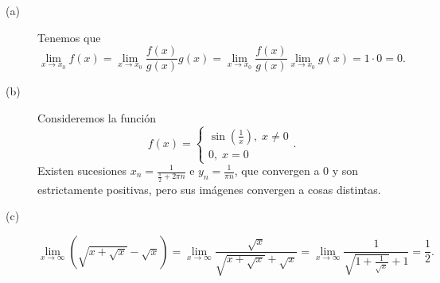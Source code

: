 \documentclass{article}
\begin{document}
\begin{sol}
\begin{description}
\item[(a)] Tenemos que 
	\[\lim_{x \to x_{0}}f\left(x\right) = \lim_{x \to x_{0}} \frac{f\left(x\right)}{g\left(x\right)}g\left(x\right) = \lim_{x \to x_{0}}\frac{f\left(x\right)}{g\left(x\right)}\lim_{x \to x_{0}}g\left(x\right) = 1 \cdot 0 = 0 .\]
\item[(b)] Consideremos la función
\[f\left(x\right) =
\begin{cases}
\sin\left(\frac{1}{x}\right), \; x \neq 0 \\
0, \; x = 0
\end{cases}
.\]
Existen sucesiones $\displaystyle x_{n} = \frac{1}{\frac{\pi }{2} + 2\pi n} $ e $\displaystyle y_{n} = \frac{1}{\pi n} $, que convergen a $\displaystyle 0 $ y son estrictamente positivas, pero sus imágenes convergen a cosas distintas.
\item[(c)] 
\[\lim_{x \to \infty}\left(\sqrt{x + \sqrt{x}}-\sqrt{x}\right) = \lim_{x \to \infty}\frac{\sqrt{x}}{\sqrt{x + \sqrt{x}}+\sqrt{x}} = \lim_{x \to \infty} \frac{1}{\sqrt{1+\frac{1}{\sqrt{x}}}+1} = \frac{1}{2} .\]
\end{description}
\end{sol}
\end{document}
